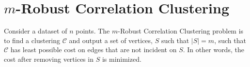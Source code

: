 




\section{$m$-Robust Correlation Clustering}
Consider a dataset of $n$ points. The $m$-Robust Correlation Clustering problem is to find a clustering $\mathcal{C}$ and output a set of vertices, $S$ such that $|S| = m$, such that $\mathcal{C}$ has least possible cost on edges that are not incident on $S$. In other words, the cost after removing vertices in $S$ is minimized.

